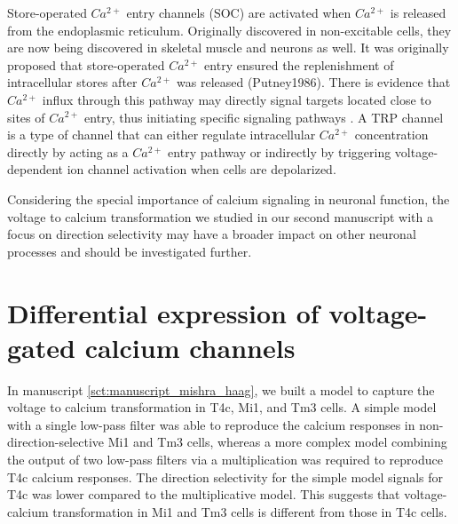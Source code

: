 Store-operated $Ca^{2+}$ entry channels (SOC) are activated when $Ca^{2+}$ is released from the endoplasmic reticulum. Originally discovered in non-excitable cells, they are now being discovered in skeletal muscle and neurons as well. It was originally proposed that store-operated $Ca^{2+}$ entry ensured the replenishment of intracellular stores after $Ca^{2+}$ was released (Putney1986). There is evidence that $Ca^{2+}$ influx through this pathway may directly signal targets located close to sites of $Ca^{2+}$ entry, thus initiating specific signaling pathways \parencite{Feske2011}. 
A TRP channel is a type of channel that can either regulate intracellular $Ca^{2+}$ concentration directly by acting as a $Ca^{2+}$ entry pathway or indirectly by triggering voltage-dependent ion channel activation when cells are depolarized.

Considering the special importance of calcium signaling in neuronal function, the voltage to calcium transformation we studied in our second manuscript with a focus on direction selectivity may have a broader impact on other neuronal processes and should be investigated further.

\section{Differential expression of voltage-gated calcium channels}

In manuscript \ref{sct:manuscript_mishra_haag}, we built a model to capture the voltage to calcium transformation in T4c, Mi1, and Tm3 cells. A simple model with a single low-pass filter was able to reproduce the calcium responses in non-direction-selective Mi1 and Tm3 cells, whereas a more complex model combining the output of two low-pass filters via a multiplication was required to reproduce T4c calcium responses. The direction selectivity for the simple model signals for T4c was lower compared to the multiplicative model. This suggests that voltage-calcium transformation in Mi1 and Tm3 cells is different from those in T4c cells. 

